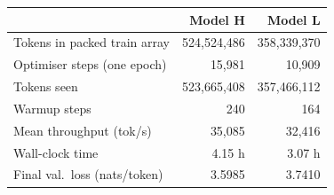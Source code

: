 \begin{tabular}{lrr}
\toprule
 & Model H & Model L \\
\midrule
Tokens in packed train array & 524,524,486 & 358,339,370 \\
Optimiser steps (one epoch) & 15,981 & 10,909 \\
Tokens seen & 523,665,408 & 357,466,112 \\
Warmup steps & 240 & 164 \\
Mean throughput (tok/s) & 35,085 & 32,416 \\
Wall-clock time & 4.15 h & 3.07 h \\
Final val.\ loss (nats/token) & 3.5985 & 3.7410 \\
\bottomrule
\end{tabular}
